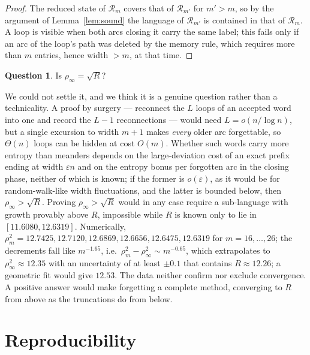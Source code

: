 \documentclass[11pt]{amsart}
\theoremstyle{definition}
\newtheorem{question}[theorem]{Question}
\newcommand{\Rel}{\mathcal R}
\begin{document}
\begin{proof}
The reduced state of $\Rel_m$ covers that of $\Rel_{m'}$ for $m'>m$, so by the argument of Lemma~\ref{lem:sound} the language of $\Rel_{m'}$ is contained in that of $\Rel_m$. A loop is visible when both arcs closing it carry the same label; this fails only if an arc of the loop's path was deleted by the memory rule, which requires more than $m$ entries, hence width $>m$, at that time.
\end{proof}

\begin{question}\label{q:conv}
Is $\rho_\infty=\sqrt R$?
\end{question}

We could not settle it, and we think it is a genuine question rather than a technicality. A proof by surgery --- reconnect the $L$ loops of an accepted word into one and record the $L-1$ reconnections --- would need $L=o(n/\log n)$, but a single excursion to width $m+1$ makes \emph{every} older arc forgettable, so $\Theta(n)$ loops can be hidden at cost $O(m)$. Whether such words carry more entropy than meanders depends on the large-deviation cost of an exact prefix ending at width $\varepsilon n$ and on the entropy bonus per forgotten arc in the closing phase, neither of which is known; if the former is $o(\varepsilon)$, as it would be for random-walk-like width fluctuations, and the latter is bounded below, then $\rho_\infty>\sqrt R$. Proving $\rho_\infty>\sqrt R$ would in any case require a sub-language with growth provably above $R$, impossible while $R$ is known only to lie in $[11.6080,12.6319]$. Numerically, $\rho_m^2=12.7425,12.7120,12.6869,12.6656,12.6475,12.6319$ for $m=16,\dots,26$; the decrements fall like $m^{-1.65}$, i.e.\ $\rho_m^2-\rho_\infty^2\sim m^{-0.65}$, which extrapolates to $\rho_\infty^2\approx12.35$ with an uncertainty of at least $\pm0.1$ that contains $R\approx12.26$; a geometric fit would give $12.53$. The data neither confirm nor exclude convergence. A positive answer would make forgetting a complete method, converging to $R$ from above as the truncations do from below.

\section{Reproducibility}\label{sec:repro}
\end{document}
